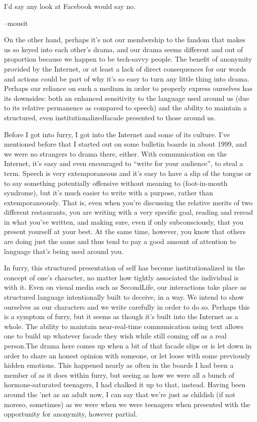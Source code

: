 I'd say any look at Facebook would say no.

--mousit

On the other hand, perhaps it's not our membership to the fandom that makes us so keyed into each other's drama, and our drama seems different and out of proportion because we happen to be tech-savvy people. The benefit of anonymity provided by the Internet, or at least a lack of direct consequences for our words and actions could be part of why it's so easy to turn any little thing into drama. Perhaps our reliance on such a medium in order to properly express ourselves has its downsides: both an enhanced sensitivity to the language used around us (due to its relative permanence as compared to speech) and the ability to maintain a structured, even institutionalizedfacade presented to those around us.

Before I got into furry, I got into the Internet and some of its culture. I've mentioned before that I started out on some bulletin boards in about 1999, and we were no strangers to drama there, either. With communication on the Internet, it's easy and even encouraged to ``write for your audience'', to steal a term. Speech is very extemporaneous and it's easy to have a slip of the tongue or to say something potentially offensive without meaning to (foot-in-mouth syndrome), but it's much easier to write with a purpose, rather than extemporaneously. That is, even when you're discussing the relative merits of two different restaurants, you are writing with a very specific goal, reading and reread in what you've written, and making sure, even if only subconsciously, that you present yourself at your best. At the same time, however, you know that others are doing just the same and thus tend to pay a good amount of attention to language that's being used around you.

In furry, this structured presentation of self has become institutionalized in the concept of one's character, no matter how tightly associated the individual is with it. Even on visual media such as SecondLife, our interactions take place as structured language intentionally built to deceive, in a way. We intend to show ourselves as our characters and we write carefully in order to do so. Perhaps this is a symptom of furry, but it seems as though it's built into the Internet as a whole. The ability to maintain near-real-time communication using text allows one to build up whatever facade they wish while still coming off as a real person.The drama here comes up when a bit of that facade slips or is let down in order to share an honest opinion with someone, or let loose with some previously hidden emotions. This happened nearly as often in the boards I had been a member of as it does within furry, but seeing as how we were all a bunch of hormone-saturated teenagers, I had chalked it up to that, instead. Having been around the 'net as an adult now, I can say that we're just as childish (if not moreso, sometimes) as we were when we were teenagers when presented with the opportunity for anonymity, however partial.

